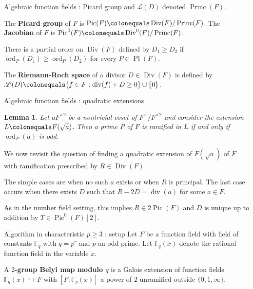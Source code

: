 \documentclass[xcolor=dvipsnames,handout]{beamer}
\theoremstyle{plain}
\newtheorem*{lem}{Lemma}
\newcommand{\FF}{\mathbb{F}}
\DeclareMathOperator{\Div}{Div}
\DeclareMathOperator{\Princ}{Princ}
\DeclareMathOperator{\Pic}{Pic}
\DeclareMathOperator{\ddiv}{div}
\DeclareMathOperator{\ord}{ord}
\DeclareMathOperator{\Pl}{Pl}
\begin{document}
{\begin{frame}{Algebraic function fields : Picard group and $\mathscr{L}(D)$}
      denoted $\Princ(F)$.
      \pause\par
      The \textbf{Picard group} of $F$ is
      $\Pic(F)\colonequals\Div(F)/\Princ(F)$.
      \newline
      The \textbf{Jacobian} of $F$ is
      $\Pic^0(F)\colonequals\Div^0(F)/\Princ(F)$.
      \pause\par
      There is a partial order on $\Div(F)$
      defined by $D_1\geq D_2$ if
      $\ord_P(D_1)\geq\ord_P(D_2)$ for
      every $P\in\Pl(F)$.
      \pause\par
      The \textbf{Riemann-Roch space} of a divisor
      $D\in\Div(F)$ is defined by
      $\mathscr{L}(D)\colonequals\{f\in F : \ddiv(f)+D\geq 0\}\cup\{0\}$.
    \end{frame}
    \begin{frame}{Algebraic function fields : quadratic extensions}
      \begin{lem}
        \vspace{1pt}
        Let $aF^{\times 2}$ be a nontrivial coset of
        $F^\times/F^{\times 2}$ and consider the
        extension $L\colonequals F(\sqrt{a})$.
        Then a prime $P$ of $F$ is
        ramified in $L$
        if and only if
        $\ord_P(a)$ is odd.
      \end{lem}
      \pause
      We now revisit the question of finding a quadratic extension
      of $F(\sqrt{a})$ of $F$ with ramification prescribed
      by $R\in\Div(F)$.
      \pause\par
      The simple cases are when no such $a$ exists
      or when $R$ is principal.
      The last case occurs when there exists
      $D$ such that $R-2D=\ddiv(a)$ for some $a\in F$.
      \pause\par
      As in the number field setting, this implies
      $R\in 2\Pic(F)$ and $D$ is unique up to
      addition by $T\in\Pic^0(F)[2]$.
    \end{frame}
    \begin{frame}{Algorithm in characteristic $p\geq 3$ : setup}
      Let $F$ be a function field with
      field of constants $\FF_q$
      with $q=p^r$ and $p$ an odd prime.
      Let $\FF_q(x)$ denote the rational function field
      in the variable $x$.
      \pause\par
      A \textbf{$2$-group Belyi map modulo $q$}
      is a Galois extension of function fields
      $\FF_q(x)\hookrightarrow F$
      with $[F:\FF_q(x)]$ a power of $2$
      unramified outside $\{0,1,\infty\}$.
      \pause\par

\end{frame}}
\end{document}
